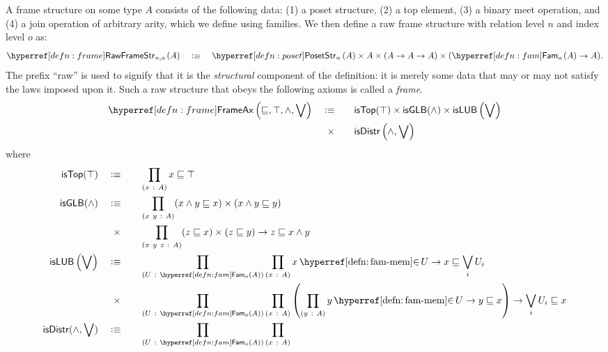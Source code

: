 \begin{defn}[Frame]\label{defn:frame}
  A frame structure on some type $A$ consists of the following data: (1) a poset
  structure, (2) a top element, (3) a binary meet operation, and (4) a join operation of
  arbitrary arity, which we define using families. We then define a raw frame structure
  with relation level $n$ and index level $o$ as:
  \begin{equation*}
    \rawframestr{n}{o}{A} \quad\is\quad \posetstr{n}{A} \times A \times (A \rightarrow A \rightarrow A) \times (\sub{o}{A} \rightarrow A).
  \end{equation*}
  The prefix ``raw'' is used to signify that it is the \emph{structural} component of the
  definition: it is merely some data that may or may not satisfy the laws imposed upon it.
  Such a raw structure that obeys the following axioms is called a \emph{frame}.
  \begin{alignat*}{2}
    \frameax{\sqsubseteq, \top, \wedge, \bigvee} \quad&\is\quad             &&\mathsf{isTop}(\top) \times
                                              \mathsf{isGLB}(\wedge) \times
                                              \mathsf{isLUB}\left( \bigvee \right)\\
                          &\hspace{0.55em}\times &&\mathsf{isDistr}\left( \wedge, \bigvee \right)
  \end{alignat*}
  where
  \begin{alignat*}{2}
    \mathsf{isTop}(\top) \quad&\is\quad &&\pity{x}{A}{x \sqsubseteq \top}\\
    \mathsf{isGLB}(\wedge) \quad&\is\quad &&\pity{x~y}{A}{(x \wedge y \sqsubseteq x) \times (x \wedge y \sqsubseteq y)}\\
                       &\hspace{0.55em}\times &&\pity{x~y~z}{A}{(z \sqsubseteq x) \times (z \sqsubseteq y) \rightarrow z \sqsubseteq x \wedge y}\\
    \mathsf{isLUB}\left(\bigvee\right) \quad&\is\quad
         &&\pity{U}{\sub{o}{A}}{\pity{x}{A}{\memfam{x}{U} \rightarrow x \sqsubseteq \bigvee_i U_i}}\\
         &\hspace{0.55em}\times &&\pity{U}{\sub{o}{A}}{\pity{x}{A}{
        \left( \pity{y}{A}{\memfam{y}{U} \rightarrow y \sqsubseteq x}\right) \rightarrow \bigvee_i U_i \sqsubseteq x }}\\
    \mathsf{isDistr}(\wedge, \bigvee) \quad&\is\quad
      &&\pity{U}{\sub{o}{A}}{\pity{x}{A}{
}}
\end{alignat*}
\end{defn}
